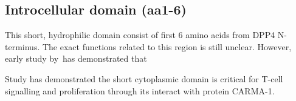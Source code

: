 \subsection{Introcellular domain (aa1-6)}

This short, hydrophilic domain consist of first 6 amino acids from DPP4 N-terminus. The exact functions related to this region is still unclear. However, early study by~\citet{Hong1990}has demonstrated that 

Study has demonstrated the short cytoplasmic domain is critical for T-cell signalling and proliferation through its interact with protein CARMA-1. \cite{Ohnuma_2007}